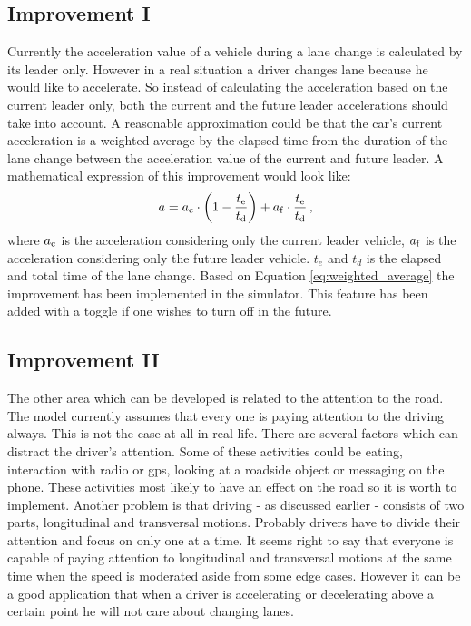 		\subsection*{Improvement I}
		Currently the acceleration value of a vehicle during a lane change is calculated by its leader only. However in a real situation a driver changes lane because he would like to accelerate. So instead of calculating the acceleration based on the current leader only, both the current and the future leader accelerations should take into account. A reasonable approximation could be that the car's current acceleration is a weighted average by the elapsed time from the duration of the lane change between the acceleration value of the current and  future leader. A mathematical expression of this improvement would look like:
		\begin{equation}
			a=a_{\rm c} \cdot \left(1-\frac{t_{\rm e}}{t_{\rm d}}\right) + a_{\rm f}\cdot \frac{t_{\rm e}}{t_{\rm d}}\,,
			\label{eq:weighted_average}
		\end{equation}
		where $a_{\rm c}$ is the acceleration considering only the current leader vehicle, $a_{\rm f}$  is the acceleration considering only the future leader vehicle. $t_e$ and $t_d$ is the elapsed and total time of the lane change. Based on Equation \ref{eq:weighted_average} the improvement has been implemented in the simulator. This feature has been added with a toggle if one wishes to turn off in the future.
		\subsection*{Improvement II}
		The other area which can be developed is related to the attention to the road. The model currently assumes that every one is paying attention to the driving always. This is not the case at all in real life. There are several factors which can distract the driver's attention. Some of these activities could be eating, interaction with radio or gps, looking at a roadside object or messaging on the phone. These activities most likely to have an effect on the road so it is worth to implement. Another problem is that driving - as discussed earlier - consists of two parts, longitudinal and transversal motions. Probably drivers have to divide their attention and focus on only one at a time. It seems right to say that everyone is capable of paying attention to longitudinal and transversal motions at the same time when the speed is moderated aside from some edge cases. However it can be a good application that when a driver is accelerating or decelerating above a certain point he will not care about changing lanes.